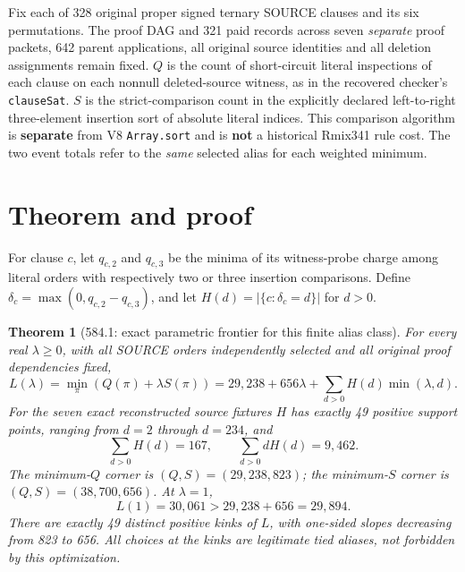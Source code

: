 \documentclass[11pt]{article}
\newtheorem{theorem}{Theorem}
\begin{document}
Fix each of 328 original proper signed ternary SOURCE clauses and its six permutations. The proof DAG and 321 paid records across seven \emph{separate} proof packets, 642 parent applications, all original source identities and all deletion assignments remain fixed. $Q$ is the count of short-circuit literal inspections of each clause on each nonnull deleted-source witness, as in the recovered checker's \texttt{clauseSat}. $S$ is the strict-comparison count in the explicitly declared left-to-right three-element insertion sort of absolute literal indices. This comparison algorithm is \textbf{separate} from V8 \texttt{Array.sort} and is \textbf{not} a historical Rmix341 rule cost. The two event totals refer to the \emph{same} selected alias for each weighted minimum.

\section*{Theorem and proof}
For clause $c$, let $q_{c,2}$ and $q_{c,3}$ be the minima of its witness-probe charge among literal orders with respectively two or three insertion comparisons. Define $\delta_c=\max(0,q_{c,2}-q_{c,3})$, and let $H(d)=|\{c:\delta_c=d\}|$ for $d>0$.

\begin{theorem}[584.1: exact parametric frontier for this finite alias class]
For every real $\lambda\ge0$, with all SOURCE orders independently selected and all original proof dependencies fixed,
\[
\boxed{
 L(\lambda)=\min_{\pi}(Q(\pi)+\lambda S(\pi))
 = 29{,}238+656\lambda+\sum_{d>0}H(d)\min(\lambda,d).
}
\]
For the seven exact reconstructed source fixtures $H$ has exactly 49 positive support points, ranging from $d=2$ through $d=234$, and
\[
\sum_{d>0}H(d)=167,\qquad \sum_{d>0}dH(d)=9{,}462.
\]
The minimum-$Q$ corner is $(Q,S)=(29{,}238,823)$; the minimum-$S$ corner is $(Q,S)=(38{,}700,656)$. At $\lambda=1$,
\[
L(1)=30{,}061 > 29{,}238+656=29{,}894.
\]
There are exactly 49 distinct positive kinks of $L$, with one-sided slopes decreasing from 823 to 656. All choices at the kinks are legitimate tied aliases, not forbidden by this optimization.
\end{theorem}
\end{document}
